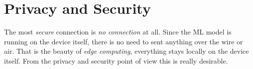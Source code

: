 \documentclass[../../main]{subfiles}
\begin{document}
\section{Privacy and Security} \label{sec:}

The most \emph{secure} connection is \emph{no connection} at all. Since the
ML model is running on the device itself, there is no need to sent anything
over the wire or air. That is the beauty of \emph{edge computing}, everything
stays locally on the device itself. From the privacy and security point of
view this is really desirable.
\end{document}

